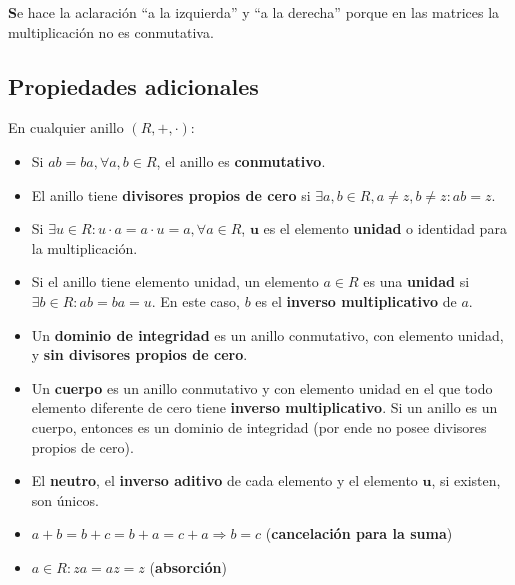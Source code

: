 \documentclass[12pt]{article}
\begin{document}
\begin{tcolorbox}[colback=yellow!15, title=Aclaración]
\textbf Se hace la aclaración ``a la izquierda'' y ``a la derecha'' porque en las matrices la multiplicación no es conmutativa.
\end{tcolorbox}


\subsection*{Propiedades adicionales}

\begin{tcolorbox}[title=Propiedades importantes]
En cualquier anillo \( (R, +, \cdot) \):
\begin{itemize}
    \item Si \( ab = ba, \forall a, b \in R \), el anillo es \textbf{conmutativo}.
    \item El anillo tiene \textbf{divisores propios de cero} si \( \exists a, b \in R, a \neq z, b \neq z : ab = z \).
    \item Si \( \exists u \in R : u \cdot a = a \cdot u = a, \forall a \in R \), \(\boldsymbol{u}\) es el elemento \textbf{unidad} o identidad para la multiplicación.
    \item Si el anillo tiene elemento unidad, un elemento \( a \in R \) es una \textbf{unidad} si \( \exists b \in R : ab = ba = u \). En este caso, \( b \) es el \textbf{inverso multiplicativo} de \( a \).
    \item Un \textbf{dominio de integridad} es un anillo conmutativo, con elemento unidad, y \textbf{sin divisores propios de cero}.
    \item Un \textbf{cuerpo} es un anillo conmutativo y con elemento unidad en el que todo elemento diferente de cero tiene \textbf{inverso multiplicativo}. Si un anillo es un cuerpo, entonces es un dominio de integridad (por ende no posee divisores propios de cero).
\end{itemize}
\end{tcolorbox}

\begin{tcolorbox}[colback=yellow!15, title=Nota]
\begin{itemize}
    \item El \textbf{neutro}, el \textbf{inverso aditivo} de cada elemento y el elemento \(\boldsymbol{u}\), si existen, son únicos. 
\end{itemize}
\end{tcolorbox}

\begin{tcolorbox}[title=Leyes de cancelación para la suma y absorción]
\begin{itemize}
    \item  \( a + b = b + c = b + a = c + a \Rightarrow b = c \) (\textbf{cancelación para la suma})
    \item \( a \in R : za = az = z \) (\textbf{absorción})
\end{itemize}
\end{tcolorbox}
\end{document}
